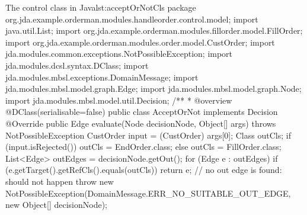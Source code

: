 \begin{lstcodeplainssm}{The control class  in Java}{lst:acceptOrNotCls}
package org.jda.example.orderman.modules.handleorder.control.model;
import java.util.List;
import org.jda.example.orderman.modules.fillorder.model.FillOrder;
import org.jda.example.orderman.modules.order.model.CustOrder;
import jda.modules.common.exceptions.NotPossibleException;
import jda.modules.dcsl.syntax.DClass;
import jda.modules.mbsl.exceptions.DomainMessage;
import jda.modules.mbsl.model.graph.Edge;
import jda.modules.mbsl.model.graph.Node;
import jda.modules.mbsl.model.util.Decision;
/**
* @overview 
@DClass(serialisable=false)
public class AcceptOrNot implements Decision {
	@Override
	public Edge evaluate(Node decisionNode, Object[] args) throws NotPossibleException {
		CustOrder input = (CustOrder) args[0];	
		Class outCls;
		if (input.isRejected()) {
			outCls = EndOrder.class;
		} else {
			outCls = FillOrder.class;
		}		
		List<Edge> outEdges = decisionNode.getOut();
		for (Edge e : outEdges) {
			if (e.getTarget().getRefCls().equals(outCls)) {
				return e;
			}
		}		
		// no out edge is found: should not happen
		throw new NotPossibleException(DomainMessage.ERR_NO_SUITABLE_OUT_EDGE, new Object[] {decisionNode});
	}	
}
\end{lstcodeplainssm}

